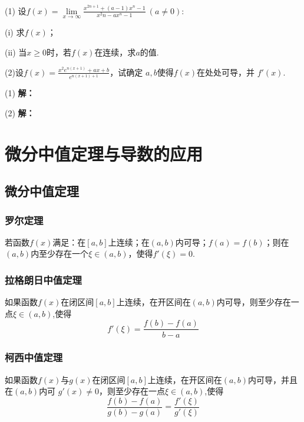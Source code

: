 \documentclass[12pt , a4paper , oneside]{ctexart}
\begin{document}
            \quad
            
            (1) 设$f(x)=\lim\limits_{x \to \infty} \frac{x^{2n+1} + (a-1)x^n - 1}{x^2n -ax^n - 1}~(a\neq 0)$:
            
            \qquad (i) 求$f(x)$；

            \qquad (ii) 当$x \geqslant 0$时，若$f(x)$在连续，求$a$的值.

            (2)设$f(x) = \frac{x^{2} e^{n(x+1)} +ax + b}{e^{n(x+1) + 1}}$，试确定 $a,b$使得$f(x)$在处处可导，并 $f'(x)$.

            \begin{mdframed}
            (1) \textbf{解：}
            
            \end{mdframed}

            \begin{mdframed}
            (2) \textbf{解：}

            \end{mdframed}

    \section{微分中值定理与导数的应用}
        \subsection{微分中值定理}
            \subsubsection{罗尔定理}
            若函数$f(x)$满足：在$[a,b]$上连续；在$(a,b)$内可导；$f(a) = f(b)$；则在$(a,b)$内至少存在一个$\xi \in (a,b)$，使得$f'(\xi) = 0$.

            \subsubsection{拉格朗日中值定理}
            如果函数$f(x)$在闭区间$[a,b]$上连续，在开区间在$(a,b)$内可导，则至少存在一点$\xi \in (a,b)$,使得
            $$f'(\xi)=\frac{f(b)-f(a)}{b-a}$$

            \subsubsection{柯西中值定理}
            如果函数$f(x)$与$g(x)$在闭区间$[a,b]$上连续，在开区间在$(a,b)$内可导，并且在$(a,b)$内可
            $g'(x) \neq 0$，则至少存在一点$\xi \in (a,b)$,使得
            $$\frac{f(b)-f(a)}{g(b)-g(a)} = \frac{f'(\xi)}{g'(\xi)}$$
            
\end{document}
